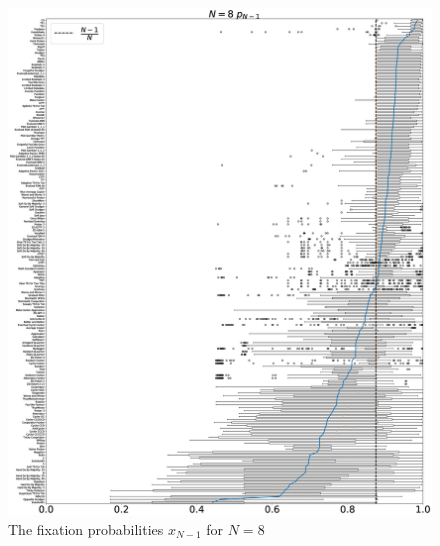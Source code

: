 \documentclass[10pt,letterpaper]{article}
\begin{document}
\begin{figure}[!hbtp]
    \centering
    \includegraphics[draft, width=\textwidth]{./Fig30.eps}
    \caption{The fixation probabilities \(x_{N-1}\) for \(N=8\)}
\end{figure}
\end{document}
